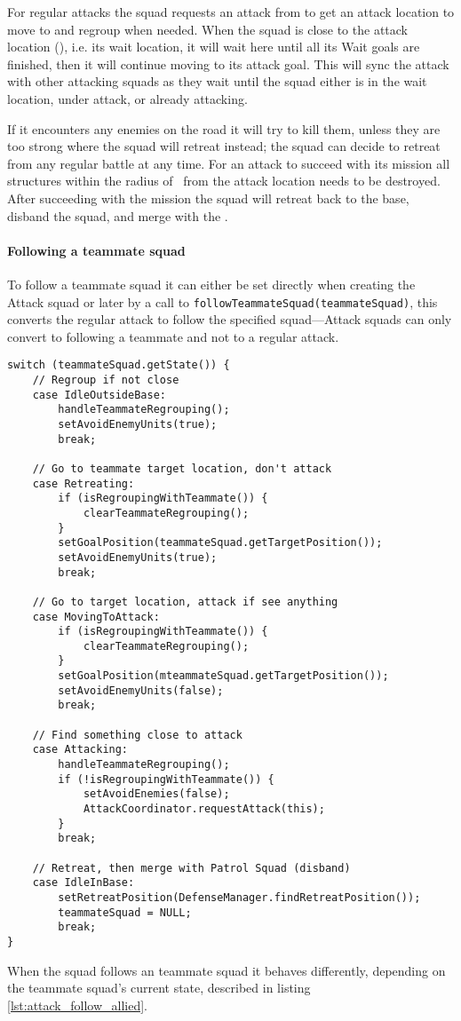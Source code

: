 For regular attacks the squad requests an attack from  to get an
attack location to move to and regroup when needed. When the squad is close to the attack location
(\squadAttackWaitingPositionDistanceFromGoal), i.e. its wait location, it will wait here until all
its Wait goals are finished, then it will continue moving to its attack goal. This will sync the
attack with other attacking squads as they wait until the squad either is in the wait location,
under attack, or already attacking.

If it encounters any enemies on the road it will try to kill them, unless they are too strong where
the squad will retreat instead; the squad can decide to retreat from any regular battle at any time.
For an attack to succeed with its mission all structures within the radius of
\squadAttackStructuresDestroyedGoalDistance~from the attack location needs to be destroyed. After
succeeding with the mission the squad will retreat back to the base, disband the squad, and merge
with the .

\paragraph{Following a teammate squad}
To follow a teammate squad it can either be set directly when creating the Attack squad or later by
a call to \texttt{followTeammateSquad(teammateSquad)}, this converts the regular attack to follow
the specified squad—Attack squads can only convert to following a teammate and not to a regular
attack.


\begin{lstlisting}[caption={Squad actions depending on the teammate squad's state},label={lst:attack_follow_allied}]
switch (teammateSquad.getState()) {
	// Regroup if not close
	case IdleOutsideBase:
		handleTeammateRegrouping();
		setAvoidEnemyUnits(true);
		break;
	
	// Go to teammate target location, don't attack
	case Retreating:
		if (isRegroupingWithTeammate()) {
			clearTeammateRegrouping();
		}
		setGoalPosition(teammateSquad.getTargetPosition());
		setAvoidEnemyUnits(true);
		break;

	// Go to target location, attack if see anything
	case MovingToAttack: 
		if (isRegroupingWithTeammate()) {
			clearTeammateRegrouping();
		}
		setGoalPosition(mteammateSquad.getTargetPosition());
		setAvoidEnemyUnits(false);
		break;

	// Find something close to attack
	case Attacking:
		handleTeammateRegrouping();
		if (!isRegroupingWithTeammate()) {
			setAvoidEnemies(false);
			AttackCoordinator.requestAttack(this);
		}
		break;

	// Retreat, then merge with Patrol Squad (disband)
	case IdleInBase:
		setRetreatPosition(DefenseManager.findRetreatPosition());
		teammateSquad = NULL;
		break;
}
\end{lstlisting}
When the squad follows an teammate squad it behaves differently, depending on the teammate squad's
current state, described in listing \ref{lst:attack_follow_allied}.


